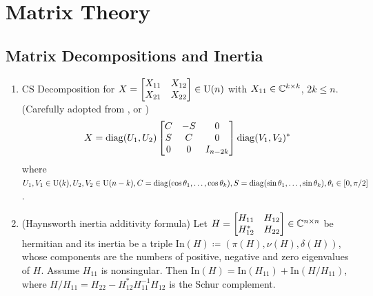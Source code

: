 \section{Matrix Theory}
\label{sec:matrix-theory}

\subsection{Matrix Decompositions and Inertia}
\label{sec:matrix-decompositions}
\begin{enumerate}
    \item CS Decomposition for $X=\begin{bmatrix} X_{11} & X_{12} \\ X_{21} & X_{22} \end{bmatrix} \in \operatorname{U}(n)$ with $X_{11}\in \mathbb{C}^{k\times k}$, $2k \le n$. (Carefully adopted from \cite[Theorem~2.5.3]{golub_matrixcomp_2013}, or \cite[Section~4]{paige_towards_1981}) 
    \[ X= \operatorname{diag}(U_1, U_2) \begin{bmatrix} C & -S & 0 \\ S & C & 0 \\ 0 & 0 & I_{n-2k} \end{bmatrix} \operatorname{diag}(V_1,V_2)^* \]
    where $U_1,V_1\in \operatorname{U}(k), U_2,V_2\in \operatorname{U}(n-k),C=\operatorname{diag}(\cos\theta_1,\dots,\cos\theta_k),S=\operatorname{diag}(\sin\theta_1,\dots,\sin\theta_k),\theta_i\in [0,\pi/2]$.
    \item (Haynsworth inertia additivity formula) Let $H=\begin{bmatrix}
        H_{11} & H_{12} \\ H_{12}^* & H_{22}
    \end{bmatrix} \in \mathbb{C}^{n\times n}$ be hermitian and its inertia be a triple $\text{In}(H) \coloneqq (\pi(H), \nu(H),\delta(H))$, whose components are the numbers of positive, negative and zero eigenvalues of $H$. Assume $H_{11}$ is nonsingular. Then $\text{In}(H)=\text{In}(H_{11}) + \text{In}(H/H_{11})$, where $H/H_{11}=H_{22}-H_{12}^*H_{11}^{-1}H_{12}$ is the Schur complement.
\end{enumerate}

